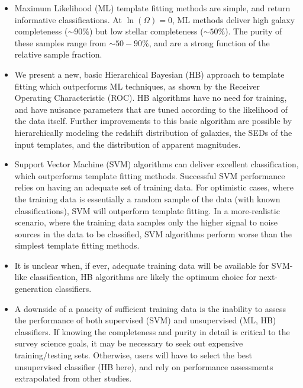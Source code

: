 \documentclass[12pt,preprint]{aastex}
\begin{document}
\begin{itemize}

\item Maximum Likelihood (ML) template fitting methods are simple, and
  return informative classifications.  At $\ln(\Omega)=0$, ML methods
  deliver high galaxy completeness ($\sim90\%$) but low stellar
  completeness ($\sim50\%$).  The purity of these samples range from
  $\sim50-90\%$, and are a strong function of the relative sample
  fraction.

\item We present a new, basic Hierarchical Bayesian (HB) approach to template
  fitting which outperforms ML techniques, as shown by the Receiver
  Operating Characteristic (ROC).  HB algorithms have no need for training, 
  and have nuisance parameters that are tuned according to the likelihood 
  of the data itself.  Further improvements to this basic algorithm are possible by
  hierarchically modeling the redshift distribution of galaxies, the
  SEDs of the input templates, and the distribution of apparent
  magnitudes.

\item Support Vector Machine (SVM) algorithms can deliver excellent
  classification, which outperforms template fitting methods.
  Successful SVM performance relies on having an adequate set of
  training data.  For optimistic cases, where the training data is
  essentially a random sample of the data (with known
  classifications), SVM will outperform template fitting.  In a
  more-realistic scenario, where the training data samples only the
  higher signal to noise sources in the data to be classified, SVM
  algorithms perform worse than the simplest template fitting methods.

\item It is unclear when, if ever, adequate training data
  will be available for SVM-like classification, HB algorithms are 
  likely the optimum choice for next-generation classifiers.

\item A downside of a paucity of sufficient training data is the
  inability to assess the performance of both supervised (SVM) and
  unsupervised (ML, HB) classifiers.  If knowing the completeness and
  purity in detail is critical to the survey science goals, it may be
  necessary to seek out expensive training/testing sets.  Otherwise,
  users will have to select the best unsupervised classifier (HB
  here), and rely on performance assessments extrapolated from other
  studies.


\end{itemize}
\end{document}
